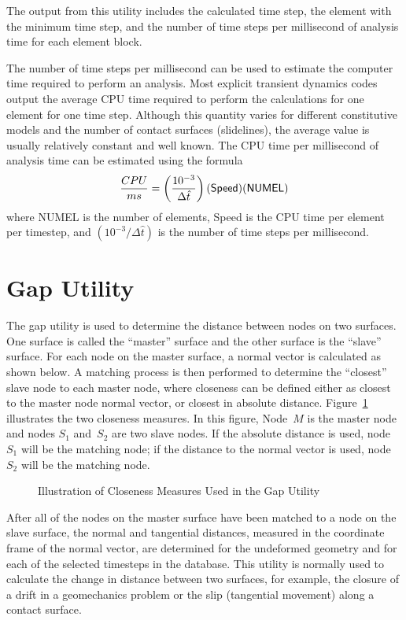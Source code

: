 The output from this utility includes the calculated time step, the
element with the minimum time step, and the number of time steps per
millisecond of analysis time for each element block.  

The number of time steps per millisecond can be used to estimate the
computer time required to perform an analysis.  Most explicit transient
dynamics codes output the average CPU time required to perform the
calculations for one element for one time step. Although this quantity
varies for different constitutive models and the number of contact
surfaces (slidelines), the average value is usually relatively constant
and well known.  The CPU time per millisecond of analysis time can be
estimated using the formula 
\begin{equation}
{CPU\over ms} = \left(10^{-3}\over \Delta\hat t\right) 
                ({\sf Speed})({\sf NUMEL})
\end{equation}
where {\sf NUMEL} is the number of elements, {\sf Speed} is the CPU time
per element per timestep, and $(10^{-3}/\Delta\hat t)$ is the number of
time steps per millisecond.  

\section{Gap Utility}\label{sec:gap}

The gap utility is used to determine the distance between nodes on two
surfaces.  One surface is called the ``master'' surface and the other
surface is the ``slave'' surface.  For each node on the master surface,
a normal vector is calculated as shown below.  A matching process is
then performed to determine the ``closest'' slave node to each master
node, where closeness can be defined either as closest to the master
node normal vector, or closest in absolute distance.  Figure~\ref{f:gap}
illustrates the two closeness measures.  In this figure, Node~$M$ is the
master node and nodes $S_1$ and~$S_2$ are two slave nodes.  If the
absolute distance is used, node~$S_1$ will be the matching node; if the
distance to the normal vector is used, node~$S_2$ will be the matching
node.  

\begin{figure}
\caption{Illustration of Closeness Measures Used in the Gap Utility}
\label{f:gap}
\end{figure}

After all of the nodes on the master surface have been matched to a node
on the slave surface, the normal and tangential distances, measured in
the coordinate frame of the normal vector, are determined for the
undeformed geometry and for each of the selected timesteps in the
database.  This utility is normally used to calculate the change in
distance between two surfaces, for example, the closure of a drift in a
geomechanics problem or the slip (tangential movement) along a contact
surface. 

